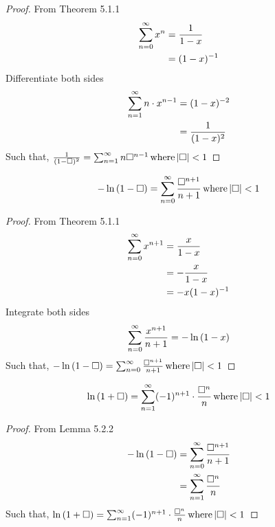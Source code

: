 \begin{proof}
  From Theorem 5.1.1
  \begin{equation}
    \nonumber
    \begin{aligned}
      \sum_{n=0}^{\infty} x^n &= \frac{1}{1 - x} \\
      &= (1 - x)^{-1}
    \end{aligned}
  \end{equation}
  Differentiate both sides
  \begin{equation}
    \nonumber
    \begin{aligned}
      \sum_{n=1}^{\infty} n \cdot x^{n-1} &= (1-x)^{-2} \\
      &= \frac{1}{(1-x)^2}
    \end{aligned}
  \end{equation}
  Such that, \(\frac{1}{(1-\Box)^2} = \sum_{n=1}^{\infty} n \Box^{n-1} \, \mathrm{where} \, |\Box| < 1 \)
\end{proof}

\begin{lemma}
  \[
    - \ln{(1-\Box)} = \sum_{n=0}^{\infty} \frac{\Box^{n+1}}{n+1} \, \mathrm{where} \, |\Box| < 1
  \]
\end{lemma}

\begin{proof}
  From Theorem 5.1.1
  \begin{equation}
    \nonumber
    \begin{aligned}
      \sum_{n=0}^{\infty} x^{n+1} &= \frac{x}{1 - x} \\
      &= - \frac{x}{1 - x} \\
      &= -x(1 - x)^{-1}
    \end{aligned}
  \end{equation}
  Integrate both sides
  \begin{equation}
    \nonumber
    \begin{aligned}
      \sum_{n=0}^{\infty} \frac{x^{n+1}}{n+1} &= - \ln{(1-x)} \\
    \end{aligned}
  \end{equation}
  Such that, \(- \ln{(1-\Box)} = \sum_{n=0}^{\infty} \frac{\Box^{n+1}}{n+1} \, \mathrm{where} \, |\Box| < 1 \)
\end{proof}

\begin{lemma}
  \[
    \ln{(1+\Box)} = \sum_{n=1}^{\infty} (-1)^{n+1} \cdot \frac{\Box^n}{n} \, \mathrm{where} \, |\Box| < 1
  \]
\end{lemma}

\begin{proof}
  From Lemma 5.2.2
  \begin{equation}
    \nonumber
    \begin{aligned}
      - \ln{(1-\Box)} &= \sum_{n=0}^{\infty} \frac{\Box^{n+1}}{n+1} \\
      &= \sum_{n=1}^{\infty} \frac{\Box^n}{n}
    \end{aligned}
  \end{equation}
  Such that, \(\ln{(1+\Box)} = \sum_{n=1}^{\infty} (-1)^{n+1} \cdot \frac{\Box^n}{n} \, \mathrm{where} \, |\Box| < 1 \)
\end{proof}
  
